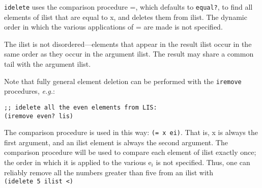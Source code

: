 \begin{entry}{%
  }

  \texttt{idelete} uses the comparison procedure =, which defaults to
  \texttt{equal?}, to find all elements of ilist that are equal to x,
  and deletes them from ilist. The dynamic order in which the various
  applications of = are made is not specified.

  The ilist is not disordered---elements that appear in the result
  ilist occur in the same order as they occur in the argument
  ilist. The result may share a common tail with the argument ilist.

  Note that fully general element deletion can be performed with the
  \texttt{iremove} procedures, \emph{e.g.}:

\begin{verbatim}
;; idelete all the even elements from LIS:
(iremove even? lis)
\end{verbatim}

  The comparison procedure is used in this way: \texttt{(=\ x\
    ei)}. That is, x is always the first argument, and an ilist
  element is always the second argument. The comparison procedure will
  be used to compare each element of ilist exactly once; the order in
  which it is applied to the various e$_i$ is not specified. Thus, one
  can reliably remove all the numbers greater than five from an ilist
  with \texttt{(idelete\ 5\ ilist\ \textless{})}
\end{entry}

